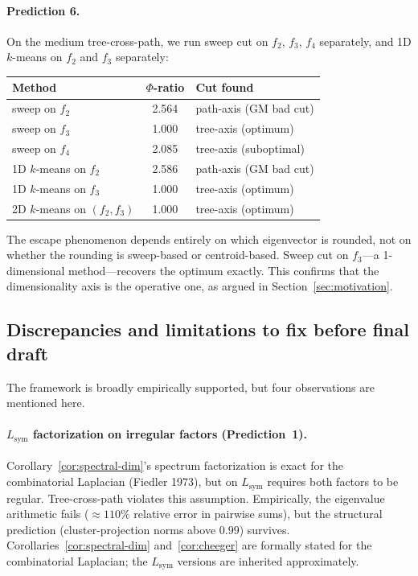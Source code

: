 \documentclass{article}
\theoremstyle{definition}
\theoremstyle{remark}
\begin{document}
\paragraph{Prediction 6.} On the medium tree-cross-path, we run sweep cut on $f_2$, $f_3$, $f_4$ separately, and 1D $k$-means on $f_2$ and $f_3$ separately:
\begin{center}
\begin{tabular}{lcl}
\toprule
Method & $\Phi$-ratio & Cut found \\
\midrule
sweep on $f_2$ & 2.564 & path-axis (GM bad cut) \\
sweep on $f_3$ & 1.000 & tree-axis (optimum) \\
sweep on $f_4$ & 2.085 & tree-axis (suboptimal) \\
1D $k$-means on $f_2$ & 2.586 & path-axis (GM bad cut) \\
1D $k$-means on $f_3$ & 1.000 & tree-axis (optimum) \\
2D $k$-means on $(f_2, f_3)$ & 1.000 & tree-axis (optimum) \\
\bottomrule
\end{tabular}
\end{center}
The escape phenomenon depends entirely on which eigenvector is rounded, not on whether the rounding is sweep-based or centroid-based. Sweep cut on $f_3$---a 1-dimensional method---recovers the optimum exactly. This confirms that the dimensionality axis is the operative one, as argued in Section~\ref{sec:motivation}.

\subsection{Discrepancies and limitations to fix before final draft}
\label{sec:discrepancies}

The framework is broadly empirically supported, but four observations are mentioned here.

\paragraph{$L_{\mathrm{sym}}$ factorization on irregular factors (Prediction~1).} Corollary~\ref{cor:spectral-dim}'s spectrum factorization is exact for the combinatorial Laplacian (Fiedler 1973), but on $L_{\mathrm{sym}}$ requires both factors to be regular. Tree-cross-path violates this assumption. Empirically, the eigenvalue arithmetic fails ($\approx 110\%$ relative error in pairwise sums), but the structural prediction (cluster-projection norms above $0.99$) survives. Corollaries~\ref{cor:spectral-dim} and~\ref{cor:cheeger} are formally stated for the combinatorial Laplacian; the $L_{\mathrm{sym}}$ versions are inherited approximately.
\end{document}
